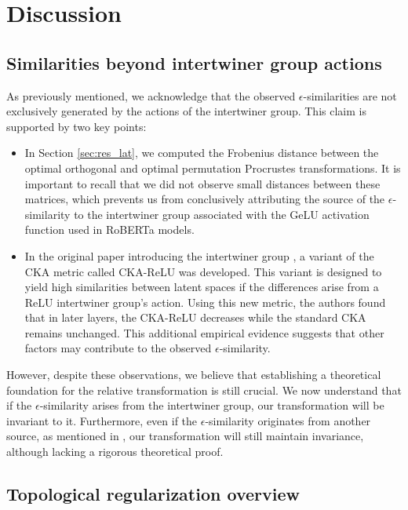 \documentclass[../main.tex]{subfiles}
\begin{document}
\chapter{Discussion}
\label{ch:discussion}

\section{Similarities beyond intertwiner group actions}
\label{sec:more_sim}

As previously mentioned, we acknowledge that the observed $\epsilon$-similarities are not exclusively generated by the actions of the intertwiner group. This claim is supported by two key points:
\begin{itemize}
    \item In Section \ref{sec:res_lat}, we computed the Frobenius distance between the optimal orthogonal and optimal permutation Procrustes transformations. It is important to recall that we did not observe small distances between these matrices, which prevents us from conclusively attributing the source of the $\epsilon$-similarity to the intertwiner group associated with the GeLU activation function used in RoBERTa models.

     \item In the original paper introducing the intertwiner group \cite{godfrey_symmetries_2023}, a variant of the CKA metric called CKA-ReLU was developed. This variant is designed to yield high similarities between latent spaces if the differences arise from a ReLU intertwiner group's action. Using this new metric, the authors found that in later layers, the CKA-ReLU decreases while the standard CKA remains unchanged. This additional empirical evidence suggests that other factors may contribute to the observed $\epsilon$-similarity.
\end{itemize}

However, despite these observations, we believe that establishing a theoretical foundation for the relative transformation is still crucial. We now understand that if the $\epsilon$-similarity arises from the intertwiner group, our transformation will be invariant to it. Furthermore, even if the $\epsilon$-similarity originates from another source, as mentioned in \cite{moschella_relative_2022}, our transformation will still maintain invariance, although lacking a rigorous theoretical proof.


\section{Topological regularization overview}
\label{sec:more_topo}
\end{document}
